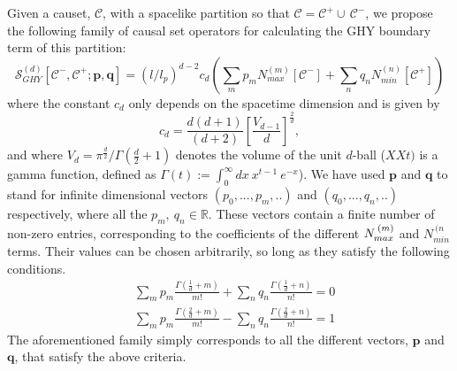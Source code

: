 \documentclass[12pt]{article}
\newcommand{\be}{\begin{equation}}
\newcommand{\ee}{\end{equation}}
\begin{document}
Given a causet, $\mathcal{C}$, with a spacelike partition so that $\mathcal C = \mathcal C^+ \cup\, \mathcal C^-$, we propose the following family of causal set operators for calculating the GHY boundary term of this partition:
\be\label{general_boundary_sum}
\mathcal{S}^{(d)}_{GHY}\left[\mathcal{C}^-,\mathcal{C}^+;\mathbf{p}, \mathbf{q} \right]= \left(l/l_p\right)^{d-2} c_{d}
\left( \sum_m p_m N_{max}^{(m)}\left[\mathcal{C}^- \right]
+  \sum_n q_n N_{min}^{(n)}\left[\mathcal{C}^+ \right]\right)
\ee
where the constant $c_{d}$ only depends on the spacetime dimension and is given by
\be\label{Cn}
c_{d}=\frac{d(d+1)}{(d+2)}\left[\frac{V_{d-1}}{d}\right]^{\frac{2}{d}},
\ee
and where $V_d=\pi^{\frac{d}{2}}/\Gamma\left(\frac{d}{2}+1\right)$ denotes the volume of the unit $d$-ball ($XXt)$ is a gamma function, defined as $\Gamma(t):=\int_0^\infty dx\: x^{t-1}\: e^{-x}$). We have used $\mathbf{p}$ and $\mathbf{q}$ to stand for infinite dimensional vectors $(p_0,...,p_m,..)$ and $(q_0,...,q_n,..)$ respectively, where all the $p_m,\: q_n \in \mathbb{R}$. These vectors contain a finite number of non-zero entries, corresponding to the coefficients of the different $N_{{max\vphantom{i}}}^{\:(m)}$ and $N_{{min}}^{\:(n}$ terms. Their values can be chosen arbitrarily, so long as they satisfy the following conditions.
\begin{align}\label{coefficient_relation1}
& \sum_m p_m \frac{\Gamma\left(\frac{1}{d}+m \right)}{m!}  + \sum_n q_n\frac{\Gamma\left(\frac{1}{d}+n \right)}{n!}=0
\\
& \label{coefficient_relation2}\sum_m p_m \frac{\Gamma\left(\frac{2}{d}+m \right)}{m!}  - \sum_n q_n\frac{\Gamma\left(\frac{2}{d}+n \right)}{n!}=1
\end{align}
The aforementioned family simply corresponds to all the different vectors, $\mathbf{p}$ and $\mathbf{q}$, that satisfy the above criteria.
\end{document}
